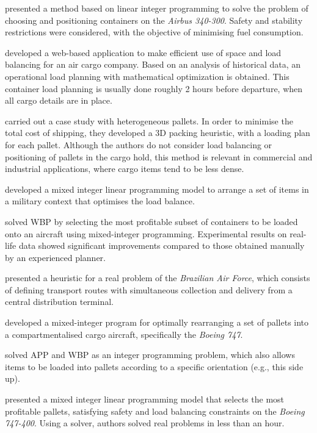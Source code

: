 \documentclass[preprint,authoryear]{elsarticle}
\begin{document}
\cite{MongeauBes2003} presented a method based on linear integer programming to solve the problem of choosing and positioning containers on the {\it Airbus 340-300}. Safety and stability restrictions were considered, with the objective of minimising fuel consumption.

\cite{fok2004optimizing} developed a web-based application to make efficient use of space and load balancing for an air cargo company. Based on an analysis of historical data, an operational load planning with mathematical optimization is obtained. This container load planning is usually done roughly 2 hours before departure, when all cargo details are in place.

\cite{Chan2006} carried out a case study with heterogeneous pallets. In order to minimise the total cost of shipping, they developed a 3D packing heuristic, with a loading plan for each pallet. Although the authors do not consider load balancing or positioning of pallets in the cargo hold, this method is relevant in commercial and industrial applications, where cargo items tend to be less dense.

\cite{KaluznyBohdanL2009Oalb} developed a mixed integer linear programming model to arrange a set of items in a military context that optimises the load balance.

\cite{Verstichel2011} solved WBP by selecting the most profitable subset of containers to be loaded onto an aircraft using mixed-integer programming. Experimental results on real-life data showed significant improvements compared to those obtained manually by an experienced planner.

\cite{MesquitaCunha2011} presented a heuristic for a real problem of the {\it Brazilian Air Force}, which consists of defining transport routes with simultaneous collection and delivery from a central distribution terminal.

\cite{Limbourg2012} developed a mixed-integer program for optimally rearranging a set of pallets into a compartmentalised cargo aircraft, specifically the {\it Boeing 747}.

\cite{RoesenerHall2014} solved APP and WBP as an integer programming problem, which also allows items to be loaded into pallets according to a specific orientation (e.g., this side up).

\cite{Vancroonemburg2014} presented a mixed integer linear programming model that selects the most profitable pallets, satisfying safety and load balancing constraints on the {\it Boeing 747-400}. Using a solver, authors solved real problems in less than an hour.
\end{document}

